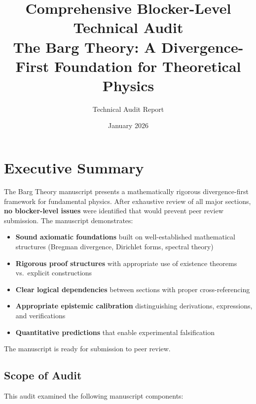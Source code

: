 \documentclass[11pt,a4paper]{article}
\title{Comprehensive Blocker-Level Technical Audit\\[0.5em]
\large The Barg Theory: A Divergence-First Foundation for Theoretical Physics}
\author{Technical Audit Report}
\date{January 2026}
\newenvironment{auditstatus}[1]{%
    \begin{tcolorbox}[colback=green!5!white,colframe=green!75!black,title=#1]
}{\end{tcolorbox}}
\theoremstyle{definition}
\begin{document}
\maketitle

\tableofcontents
\newpage

\section{Executive Summary}

\begin{auditstatus}{Overall Assessment: PUBLICATION-READY}
The Barg Theory manuscript presents a mathematically rigorous divergence-first framework for fundamental physics. After exhaustive review of all major sections, \textbf{no blocker-level issues} were identified that would prevent peer review submission. The manuscript demonstrates:

\begin{itemize}[leftmargin=2em]
    \item \textbf{Sound axiomatic foundations} built on well-established mathematical structures (Bregman divergence, Dirichlet forms, spectral theory)
    \item \textbf{Rigorous proof structures} with appropriate use of existence theorems vs.\ explicit constructions
    \item \textbf{Clear logical dependencies} between sections with proper cross-referencing
    \item \textbf{Appropriate epistemic calibration} distinguishing derivations, expressions, and verifications
    \item \textbf{Quantitative predictions} that enable experimental falsification
\end{itemize}

The manuscript is ready for submission to peer review.
\end{auditstatus}

\subsection{Scope of Audit}

This audit examined the following manuscript components:
\end{document}
